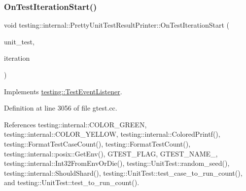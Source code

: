 \subsubsection{\texorpdfstring{On\+Test\+Iteration\+Start()}{OnTestIterationStart()}}
{\footnotesize\ttfamily void testing\+::internal\+::\+Pretty\+Unit\+Test\+Result\+Printer\+::\+On\+Test\+Iteration\+Start (\begin{DoxyParamCaption}\item[{const \hyperlink{classtesting_1_1UnitTest}{Unit\+Test} \&}]{unit\+\_\+test,  }\item[{int}]{iteration }\end{DoxyParamCaption})\hspace{0.3cm}{\ttfamily [virtual]}}



Implements \hyperlink{classtesting_1_1TestEventListener_a60cc09b7907cb329d152eb5e7133bdeb}{testing\+::\+Test\+Event\+Listener}.



Definition at line 3056 of file gtest.\+cc.



References testing\+::internal\+::\+C\+O\+L\+O\+R\+\_\+\+G\+R\+E\+EN, testing\+::internal\+::\+C\+O\+L\+O\+R\+\_\+\+Y\+E\+L\+L\+OW, testing\+::internal\+::\+Colored\+Printf(), testing\+::\+Format\+Test\+Case\+Count(), testing\+::\+Format\+Test\+Count(), testing\+::internal\+::posix\+::\+Get\+Env(), G\+T\+E\+S\+T\+\_\+\+F\+L\+AG, G\+T\+E\+S\+T\+\_\+\+N\+A\+M\+E\+\_\+, testing\+::internal\+::\+Int32\+From\+Env\+Or\+Die(), testing\+::\+Unit\+Test\+::random\+\_\+seed(), testing\+::internal\+::\+Should\+Shard(), testing\+::\+Unit\+Test\+::test\+\_\+case\+\_\+to\+\_\+run\+\_\+count(), and testing\+::\+Unit\+Test\+::test\+\_\+to\+\_\+run\+\_\+count().



